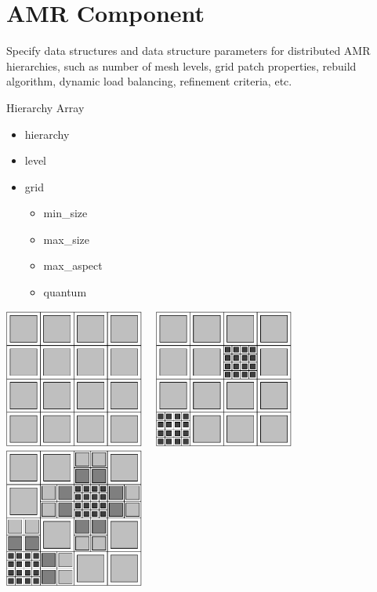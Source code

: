 \section{AMR Component} \label{s:component-amr}

Specify data structures and data structure parameters for distributed
AMR hierarchies, such as number of mesh levels, grid patch properties,
rebuild algorithm, dynamic load balancing, refinement criteria, etc.

Hierarchy
Array


\begin{itemize}
\item hierarchy
\item level
\item grid
\begin{itemize}
\item min\_size
\item max\_size
\item max\_aspect
\item quantum
\end{itemize}
\end{itemize}

\centerline{\includegraphics[width=1.8in]{amr4-1.eps} \ \
            \includegraphics[width=1.8in]{amr4-2.eps} \ \
            \includegraphics[width=1.8in]{amr4-3.eps}}

